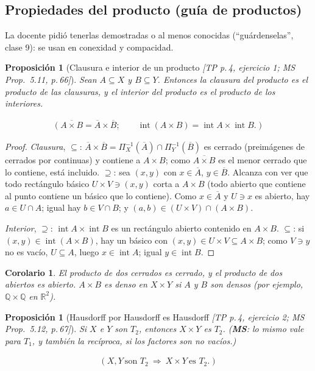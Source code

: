 \documentclass[11pt,a4paper]{article}
\newcommand{\lgc}[1]{\par\vspace{-3pt}\begin{gather*}\big(\;#1\;\big)\end{gather*}\vspace{-6pt}}
\theoremstyle{definition}
\theoremstyle{plain}
\newtheorem{proposicion}[definicion]{Proposición}
\newtheorem{corolario}[definicion]{Corolario}
\newcommand{\fnt}[1]{{\normalfont\small\itshape\color{gray!150!black}[#1]}}
\newcommand{\R}{\mathbb{R}}
\newcommand{\Q}{\mathbb{Q}}
\newcommand{\cl}[1]{\overline{#1}}
\newcommand{\intr}{\operatorname{int}}
\begin{document}
\subsection{Propiedades del producto (guía de productos)}

\noindent La docente pidió tenerlas demostradas o al menos conocidas (``guárdenselas'', clase 9): se usan en conexidad y compacidad.

\begin{proposicion}[Clausura e interior de un producto \fnt{TP p.\,4, ejercicio 1; MS Prop.\ 5.11, p.\,66}]\label{pr:clprod}
Sean $A\subseteq X$ y $B\subseteq Y$. Entonces la clausura del producto es el producto de las clausuras, y el interior del producto es el producto de los interiores.
\lgc{\cl{A\times B}=\cl A\times\cl B;\qquad \intr(A\times B)=\intr A\times\intr B.}
\end{proposicion}

\begin{proof}
\emph{Clausura}, $\subseteq$: $\cl A\times\cl B=\Pi_X^{-1}(\cl A)\cap\Pi_Y^{-1}(\cl B)$ es cerrado (preimágenes de cerrados por continuas) y contiene a $A\times B$; como $\cl{A\times B}$ es el menor cerrado que lo contiene, está incluido. $\supseteq$: sea $(x,y)$ con $x\in\cl A$, $y\in\cl B$. Alcanza con ver que todo rectángulo básico $U\times V\ni(x,y)$ corta a $A\times B$ (todo abierto que contiene al punto contiene un básico que lo contiene). Como $x\in\cl A$ y $U\ni x$ es abierto, hay $a\in U\cap A$; igual hay $b\in V\cap B$; y $(a,b)\in(U\times V)\cap(A\times B)$.

\emph{Interior}, $\supseteq$: $\intr A\times\intr B$ es un rectángulo abierto contenido en $A\times B$. $\subseteq$: si $(x,y)\in\intr(A\times B)$, hay un básico con $(x,y)\in U\times V\subseteq A\times B$; como $V\ni y$ no es vacío, $U\subseteq A$, luego $x\in\intr A$; igual $y\in\intr B$.
\end{proof}

\begin{corolario}
El producto de dos cerrados es cerrado, y el producto de dos abiertos es abierto. $A\times B$ es denso en $X\times Y$ si $A$ y $B$ son densos (por ejemplo, $\Q\times\Q$ en $\R^2$).
\end{corolario}

\begin{proposicion}[Hausdorff por Hausdorff es Hausdorff \fnt{TP p.\,4, ejercicio 2; MS Prop.\ 5.12, p.\,67}]\label{pr:t2prod}
Si $X$ e $Y$ son $T_2$, entonces $X\times Y$ es $T_2$. (\textbf{MS}: lo mismo vale para $T_1$, y también la recíproca, si los factores son no vacíos.)
\lgc{X,Y\ \text{son } T_2\ \Rightarrow\ X\times Y\ \text{es } T_2.}
\end{proposicion}
\end{document}
